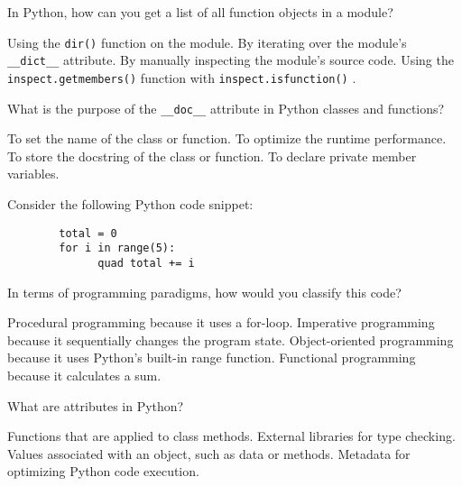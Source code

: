 \documentclass[12pt, addpoints, answers]{exam}
\begin{document}
\begin{questions}
	\question In Python, how can you get a list of all function objects in a module?
	\begin{choices}
		\choice Using the \texttt{dir()}  function on the module.
		\choice By iterating over the module's \texttt{__dict__} attribute.
		\choice By manually inspecting the module's source code.
		\CorrectChoice Using the \texttt{inspect.getmembers()} function with \texttt{inspect.isfunction()} .
	\end{choices}
				
	\question What is the purpose of the  \texttt{__doc__} attribute in Python classes and functions?
	\begin{choices}
		\choice To set the name of the class or function.
		\choice To optimize the runtime performance.
		\CorrectChoice To store the docstring of the class or function.
		\choice To declare private member variables.
	\end{choices}
				

	\question Consider the following Python code snippet:
	\begin{verbatim}
		total = 0
		for i in range(5):
		      quad total += i
	\end{verbatim}
				
	In terms of programming paradigms, how would you classify this code?
	\begin{choices}
		\choice Procedural programming because it uses a for-loop.
		\CorrectChoice Imperative programming because it sequentially changes the program state.
		\choice Object-oriented programming because it uses Python's built-in range function.
		\choice Functional programming because it calculates a sum.
	\end{choices}
				
				
				
	\question What are attributes in Python?
	\begin{choices}
		\choice Functions that are applied to class methods.
		\choice External libraries for type checking.
		\CorrectChoice Values associated with an object, such as data or methods.
		\choice Metadata for optimizing Python code execution.
	\end{choices}
				

\end{questions}
\end{document}
